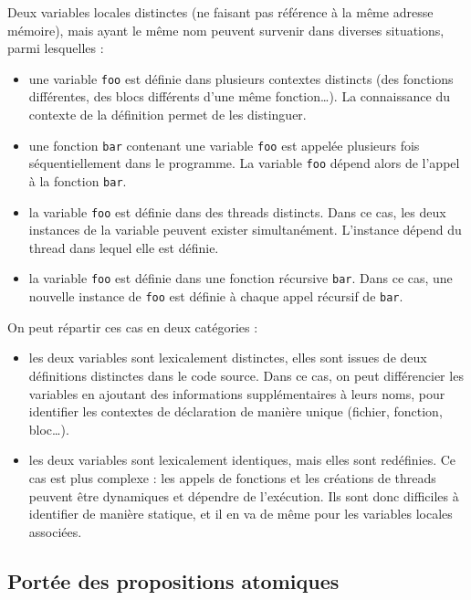 Deux variables locales distinctes (ne faisant pas référence à la même
adresse mémoire), mais ayant le même nom peuvent survenir dans diverses situations,
parmi lesquelles :

\begin{itemize}
\item
  une variable \texttt{foo} est définie dans plusieurs contextes
  distincts (des fonctions différentes, des blocs différents d'une même
  fonction\ldots{}). La connaissance du contexte de la définition permet
  de les distinguer.
\item
  une fonction \texttt{bar} contenant une variable \texttt{foo}
  est appelée plusieurs fois séquentiellement dans le programme. La
  variable \texttt{foo} dépend alors de l'appel à la fonction
  \texttt{bar}.
\item
  la variable \texttt{foo} est définie dans des threads distincts.
  Dans ce cas, les deux instances de la variable peuvent exister
  simultanément. L'instance dépend du thread dans lequel elle est
  définie.
\item
  la variable \texttt{foo} est définie dans une fonction récursive
  \texttt{bar}. Dans ce cas, une nouvelle instance de \texttt{foo}
  est définie à chaque appel récursif de \texttt{bar}.
\end{itemize}

On peut répartir ces cas en deux catégories :

\begin{itemize}
\item
  les deux variables sont lexicalement distinctes, elles sont issues de
  deux définitions distinctes dans le code source. Dans ce cas, on peut
  différencier les variables en ajoutant des informations
  supplémentaires à leurs noms, pour identifier les contextes de
  déclaration de manière unique (fichier, fonction, bloc\ldots{}).
\item
  les deux variables sont lexicalement identiques, mais elles sont
  redéfinies. Ce cas est plus complexe : les appels de fonctions et les
  créations de threads peuvent être dynamiques et dépendre de l'exécution.
  Ils sont donc difficiles à identifier de manière statique, et il en va
  de même pour les variables locales associées.
\end{itemize}

\subsection{Portée des propositions atomiques}

